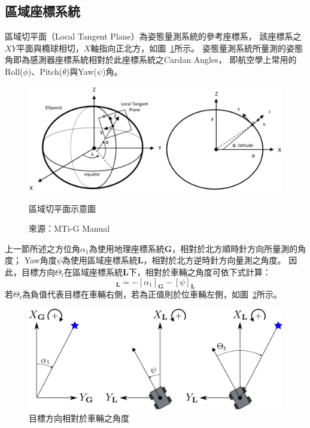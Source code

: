 \subsection{區域座標系統}
區域切平面（Local Tangent Plane）為姿態量測系統的參考座標系，
該座標系之$XY$平面與橢球相切，$X$軸指向正北方，如圖~\ref{f:LTP}所示。
姿態量測系統所量測的姿態角即為感測器座標系統相對於此座標系統之Cardan Angles，
即航空學上常用的Roll($\phi$)、Pitch($\theta$)與Yaw($\psi$)角。
\begin{figure}[h!]
	\centering
	\includegraphics[width=\textwidth]{figures/algorithm/LTP}
	\caption{區域切平面示意圖}
	\caption*{來源：MTi-G Manual}
	\label{f:LTP}
\end{figure}

上一節所述之方位角$\alpha_1$為使用地理座標系統$\mathbf{G}$，相對於北方順時針方向所量測的角度；
Yaw角度$\psi$為使用區域座標系統$\mathbf{L}$，相對於北方逆時針方向量測之角度。
因此，目標方向$\Theta_t$在區域座標系統$\mathbf{L}$下，相對於車輛之角度可依下式計算：
\begin{equation}
	[\Theta_t]_{\mathbf{L}} = -[\alpha_1]_{\mathbf{G}} - [\psi]_{\mathbf{L}}
\end{equation}
若$\Theta_t$為負值代表目標在車輛右側，若為正值則於位車輛左側，如圖~\ref{f:target_angle}所示。
\begin{figure}[h!]
	\centering
	\includegraphics[width=\textwidth]{figures/algorithm/TargetAngle}
	\caption{目標方向相對於車輛之角度}
	\label{f:target_angle}
\end{figure}

